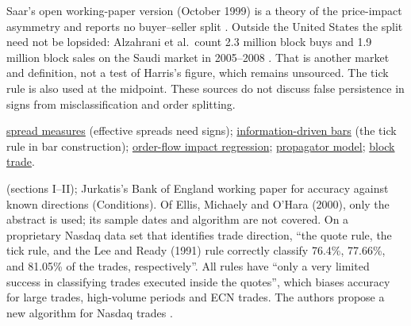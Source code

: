 \begin{qfmethod}
Saar's open working-paper version (October 1999) is a theory of the price-impact asymmetry and reports no buyer--seller split \citep[abstract and secs.~1--2]{saar-1999-wp}. Outside the United States the split need not be lopsided: Alzahrani et al.\ count 2.3 million block buys and 1.9 million block sales on the Saudi market in 2005--2008 \citep[abstract]{alzahrani-2010-wp}. That is another market and definition, not a test of Harris's figure, which remains unsourced. The tick rule is also used at the midpoint. These sources do not discuss false persistence in signs from misclassification and order splitting.

 \hyperref[def:spread-measures]{spread measures} (effective spreads need signs); \hyperref[meth:information-driven-bars]{information-driven bars} (the tick rule in bar construction); \hyperref[meth:order-flow-impact-regression]{order-flow impact regression}; \hyperref[mod:propagator]{propagator model}; \hyperref[def:block-trade]{block trade}.

 \citep{lee-ready-1991} (sections I--II); Jurkatis's Bank of England working paper for accuracy against known directions (Conditions). Of Ellis, Michaely and O'Hara (2000), only the abstract is used; its sample dates and algorithm are not covered. On a proprietary Nasdaq data set that identifies trade direction, ``the quote rule, the tick rule, and the Lee and Ready (1991) rule correctly classify 76.4\%, 77.66\%, and 81.05\% of the trades, respectively''. All rules have ``only a very limited success in classifying trades executed inside the quotes'', which biases accuracy for large trades, high-volume periods and ECN trades. The authors propose a new algorithm for Nasdaq trades \citep[abstract]{ellis-michaely-ohara-2000}.

\end{qfmethod}
